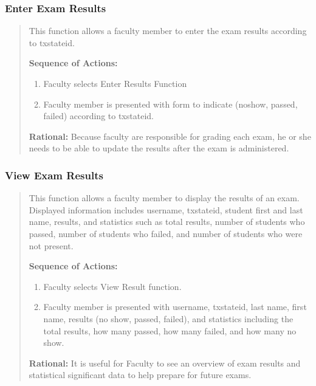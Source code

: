    \subsubsection{Enter Exam Results}
   \begin{quote} %
         This function allows a faculty member to enter the exam results
         according to txstateid.
         
         \textbf{Sequence of Actions:}
         \begin{enumerate}
            \item Faculty selects Enter Results Function
            \item Faculty member is presented with form to indicate (noshow,
               passed, failed) according to txstateid. 
         \end{enumerate}

         \textbf{Rational:}
         Because faculty are responsible for grading each exam, he or she needs
         to be able to update the results after the exam is administered.
   \end{quote} %

   \subsubsection{View Exam Results}
   \begin{quote} %
         This function allows a faculty member to display the results of an
         exam. Displayed information includes username, txstateid, student
         first and last name, results, and statistics such as total results,
         number of students who passed, number of students who
         failed, and number of students who were not present.
         
         \textbf{Sequence of Actions:}
         \begin{enumerate}
            \item Faculty selects View Result function.
            \item Faculty member is presented with username, txstateid, last
               name, first name, results (no show, passed, failed), and
               statistics including the total results, how many passed, how many
               failed, and how many no show. 
         \end{enumerate}

         \textbf{Rational:}
         It is useful for Faculty to see an overview of exam results and
         statistical significant data to help prepare for future exams.
   \end{quote} %

